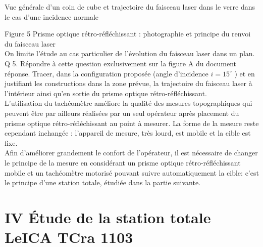 \documentclass[10pt]{article}
\begin{document}
Vue générale d'un coin de cube et trajectoire du faisceau laser dans le verre dans le cas d'une incidence normale

Figure 5 Prisme optique rétro-réfléchissant : photographie et principe du renvoi du faisceau laser\\
On limite l'étude au cas particulier de l'évolution du faisceau laser dans un plan.\\
Q 5. Répondre à cette question exclusivement sur la figure A du document réponse. Tracer, dans la configuration proposée (angle d'incidence $i=15^{\circ}$ ) et en justifiant les constructions dans la zone prévue, la trajectoire du faisceau laser à l'intérieur ainsi qu'en sortie du prisme optique rétro-réfléchissant.\\
L'utilisation du tachéomètre améliore la qualité des mesures topographiques qui peuvent être par ailleurs réalisées par un seul opérateur après placement du prisme optique rétro-réfléchissant au point à mesurer. La forme de la mesure reste cependant inchangée : l'appareil de mesure, très lourd, est mobile et la cible est fixe.\\
Afin d'améliorer grandement le confort de l'opérateur, il est nécessaire de changer le principe de la mesure en considérant un prisme optique rétro-réfléchissant mobile et un tachéomètre motorisé pouvant suivre automatiquement la cible: c'est le principe d'une station totale, étudiée dans la partie suivante.

\section*{IV Étude de la station totale LeICA TCra 1103}
\end{document}
